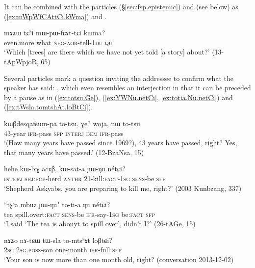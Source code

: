 It can be combined with the particles   (§\ref{sec:fsp.epistemic})  and  (see below) as  (\ref{ex:mWpWfCAttCi.kWma}) and .

\begin{exe}
\ex \label{ex:mWpWfCAttCi.kWma}
\gll  mɤʑɯ tɕʰi mɯ-pɯ-fɕɤt-tɕi kɯma? \\
 even.more what \textsc{neg}-\textsc{aor}-tell-\textsc{1du} \textsc{qu} \\
 \glt `Which [trees] are there which we have not yet told [a story] about?' (13-tApWpjoR, 65)
\end{exe} 

Several particles mark a question inviting the addressee to confirm what the speaker has said: , which even resembles an interjection in that it can be preceded by a pause as in (\ref{ex:totsu.Ge}),  (\ref{ex:YWNu.netCi}, \ref{ex:totia.Nu.netCi}) and  (\ref{ex:tWsla.tomtshAt.loBtCi}).

\begin{exe}
\ex \label{ex:totsu.Ge}
\gll kɯβdesqafsum-pa to-tsu, ɣe? woja, nɯ to-tsu \\
 43-year \textsc{ifr}-pass \textsc{sfp} \textsc{interj} \textsc{dem} \textsc{ifr}-pass \\
\glt `(How many years have passed since 1969?), 43 years have passed, right? Yes, that many years have passed.' (12-BzaNsa, 15)
\end{exe}

\begin{exe}
\ex \label{ex:YWNu.netCi}
\gll hehe kɯ-lɤɣ acɤβ, kɯ-sat-a ɲɯ-ŋu nétɕi? \\
\textsc{interj} \textsc{sbj}:\textsc{pcp}-herd  \textsc{anthr} 2\fl{}1-kill:\textsc{fact}-\textsc{1sg} \textsc{sens}-be \textsc{sfp} \\
\glt `Shepherd Askyabs, you are preparing to kill me, right?' (2003 Kunbzang, 337)
\end{exe}

\begin{exe}
\ex \label{ex:totia.Nu.netCi}
\gll  ``tʂʰa mbuz ɲɯ-ŋu" to-ti-a ŋu nétɕi? \\
tea spill.overt:\textsc{fact} \textsc{sens}-be \textsc{ifr}-say-\textsc{1sg} be:\textsc{fact} \textsc{sfp} \\
\glt `I said `The tea is abouyt to spill over', didn't I?' (26-tAGe, 15)
 \end{exe}
 
 \begin{exe}
\ex \label{ex:tWsla.tomtshAt.loBtCi}
\gll  nɤʑo nɤ-tɕɯ tɯ-sla to-mtsʰɤt loβtɕi? \\
\textsc{2sg} \textsc{2sg}.\textsc{poss}-son one-month \textsc{ifr}-full \textsc{sfp} \\
\glt `Your son is now more than one month old, right? (conversation 2013-12-02)
  \end{exe}
 
